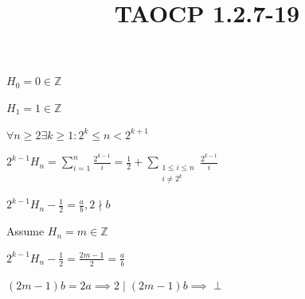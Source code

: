\documentclass{article}
\title{TAOCP 1.2.7\mbox{-}19}
\begin{document}
\maketitle

\( H_{0} = 0 \in \mathbb{Z} \)

\( H_{1} = 1 \in \mathbb{Z} \)

\( \forall n \geq 2 \exists k\geq 1: 2^{k} \leq n < 2^{k+1} \)

\( 2^{k-1}H_{n} = \sum_{i=1}^{n} \frac{2^{k-1}}{i} = \frac{1}{2} + \sum_{\substack{1 \leq i \leq n\\ i \neq 2^{k}}} \frac{2^{k-1}}{i} \)

\( 2^{k-1}H_{n} - \frac{1}{2} = \frac{a}{b}, 2 \nmid b \)

Assume \( H_{n} = m \in \mathbb{Z} \)

\( 2^{k-1}H_{n} - \frac{1}{2} = \frac{2m-1}{2} = \frac{a}{b} \)

\( (2m-1)b = 2a \implies 2 \mid (2m-1)b \implies \perp \)
\end{document}
